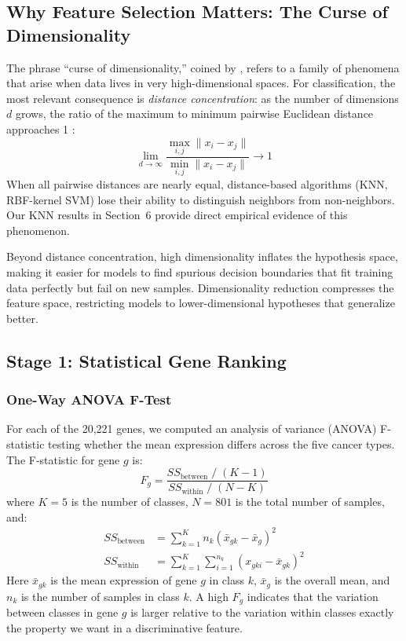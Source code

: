 \documentclass{article}
\begin{document}
\subsection{Why Feature Selection Matters: The Curse of Dimensionality}
The phrase ``curse of dimensionality,'' coined by \citet{bellman1957dynamic}, refers to a family of phenomena that arise when data lives in very high-dimensional spaces. For classification, the most relevant consequence is \textit{distance concentration}: as the number of dimensions $d$ grows, the ratio of the maximum to minimum pairwise Euclidean distance approaches 1 \citep{aggarwal2001surprising}:
\[
\lim_{d \to \infty} \frac{\max_{i,j} \|x_i - x_j\|}{\min_{i,j} \|x_i - x_j\|} \to 1
\]
When all pairwise distances are nearly equal, distance-based algorithms (KNN, RBF-kernel SVM) lose their ability to distinguish neighbors from non-neighbors. Our KNN results in Section~6 provide direct empirical evidence of this phenomenon.

Beyond distance concentration, high dimensionality inflates the hypothesis space, making it easier for models to find spurious decision boundaries that fit training data perfectly but fail on new samples. Dimensionality reduction compresses the feature space, restricting models to lower-dimensional hypotheses that generalize better.

\subsection{Stage 1: Statistical Gene Ranking}

\subsubsection{One-Way ANOVA F-Test}
For each of the 20,221 genes, we computed an analysis of variance (ANOVA) F-statistic testing whether the mean expression differs across the five cancer types. The F-statistic for gene $g$ is:
\[
F_g = \frac{SS_{\text{between}} \;/\; (K-1)}{SS_{\text{within}} \;/\; (N-K)}
\]
where $K=5$ is the number of classes, $N=801$ is the total number of samples, and:
\begin{align}
SS_{\text{between}} &= \sum_{k=1}^{K} n_k \left(\bar{x}_{gk} - \bar{x}_{g}\right)^2 \\
SS_{\text{within}} &= \sum_{k=1}^{K} \sum_{i=1}^{n_k} \left(x_{gki} - \bar{x}_{gk}\right)^2
\end{align}
Here $\bar{x}_{gk}$ is the mean expression of gene $g$ in class $k$, $\bar{x}_g$ is the overall mean, and $n_k$ is the number of samples in class $k$. A high $F_g$ indicates that the variation between classes in gene $g$ is larger relative to the variation within classes exactly the property we want in a discriminative feature.
\end{document}
